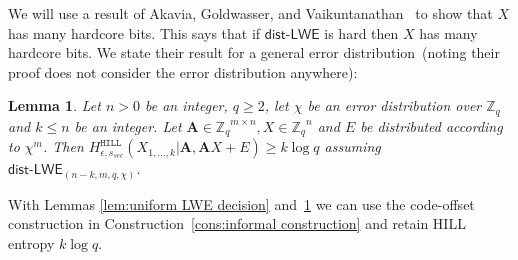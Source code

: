 \documentclass[11pt]{article}
\newcommand{\lemref}[1]{\mbox{Lemma~\ref{#1}}}
\newcommand{\consref}[1]{\mbox{Construction~\ref{#1}}}
\newcommand{\class}[1]{{\ensuremath{\mathsf{#1}}}}
\newcommand{\vect}[1]{\ensuremath{\textbf{#1}}}
\newcommand{\zq}{\ensuremath{\mathbb{Z}_q}}
\newcommand{\Fq}{\ensuremath{\mathbb{F}_q}}
\newcommand{\hill}{\ensuremath{\mathtt{HILL}}\xspace}
\newcommand{\unp}{\ensuremath{\mathtt{unp}}\xspace}
\newcommand{\poly}{\ensuremath{\mathtt{poly}}\xspace}
\newcommand{\ngl}{\ensuremath{\mathtt{ngl}}\xspace}
\newcommand{\distLWE}{\ensuremath{\class{dist\mbox{-}LWE}}}
\newtheorem{lemma}[theorem]{Lemma}
\newcommand{\vA}{\vect{A}}
\begin{document}
We will use a result of Akavia, Goldwasser, and Vaikuntanathan~\cite{akavia2009} to show that $X$ has many hardcore bits.  This says that if $\distLWE$ is hard then $X$ has many hardcore bits.  We state their result for a general error distribution~(noting their proof does not consider the error distribution anywhere):
\begin{lemma}
\label{lem:many hardcore bits}
Let $n>0$ be an integer, $q\geq 2$, let $\chi$ be an error distribution over $\zq$ and $k\leq n$ be an integer.  Let $\vA\in \zq^{m\times n} , X\in\zq^n$ and $E$ be distributed according to $\chi^m$.  Then $H^{\hill}_{\epsilon, s_{sec}}(X_{1,..., k}| \vA, \vA X+E )\geq k\log q$ assuming $\distLWE_{(n-k, m, q, \chi)}$.
\end{lemma}

With Lemmas \ref{lem:uniform LWE decision} and~\ref{lem:many hardcore bits} we can use the code-offset construction in \consref{cons:informal construction} and retain HILL entropy $k\log q$.  
\end{document}
